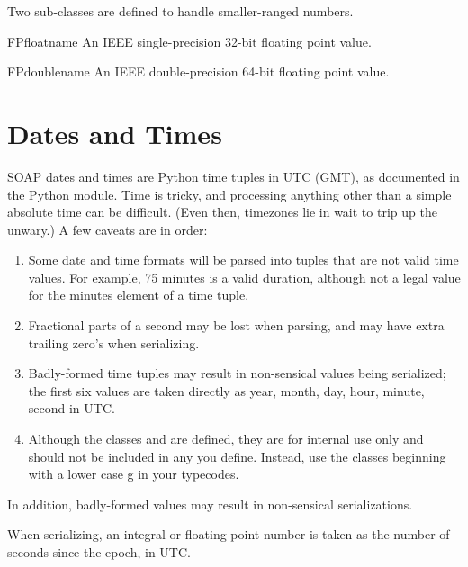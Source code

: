 Two sub-classes are defined to handle smaller-ranged numbers.

\begin{classdesc}{FPfloat}{name}
An IEEE single-precision 32-bit floating point value.
\end{classdesc}

\begin{classdesc}{FPdouble}{name}
An IEEE double-precision 64-bit floating point value.
\end{classdesc}

\section{Dates and Times}

SOAP dates and times are Python time tuples in UTC (GMT), as documented
in the Python  module.
Time is tricky, and processing anything other than a simple absolute time
can be difficult.
(Even then, timezones lie in wait to trip up the unwary.)
A few caveats are in order:

\begin{enumerate}

\item
Some date and time formats will be parsed into tuples that are
not valid time values.
For example, 75 minutes is a valid duration, although not a legal value
for the minutes element of a time tuple.

\item
Fractional parts of a second may be lost when parsing, and may have
extra trailing zero's when serializing.

\item
Badly-formed time tuples may result in non-sensical values being serialized;
the first six values are taken directly as year, month, day, hour, minute,
second in UTC.

\item
Although the classes  and  are defined, they 
are for internal use only and should not be included in any 
you define.  Instead, use the classes beginning with a lower case g in your
typecodes.

\end{enumerate}

In addition, badly-formed values may result in non-sensical serializations.

When serializing, an integral or floating point number is taken as
the number of seconds since the epoch, in UTC.

